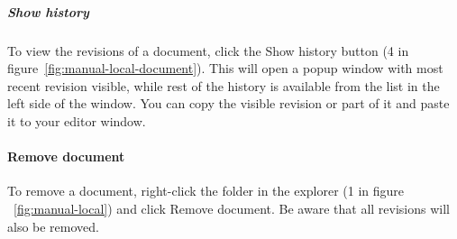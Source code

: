 		\subparagraph{Show history}
		To view the revisions of a document, click the Show history button (4 in figure~\ref{fig:manual-local-document}). This will open a popup window with most recent revision visible, while rest of the history is available from the list in the left side of the window. You can copy the visible revision or part of it and paste it to your editor window.
	
	\paragraph{Remove document}
	To remove a document, right-click the folder in the explorer (1 in figure ~\ref{fig:manual-local}) and click Remove document. Be aware that all revisions will also be removed.